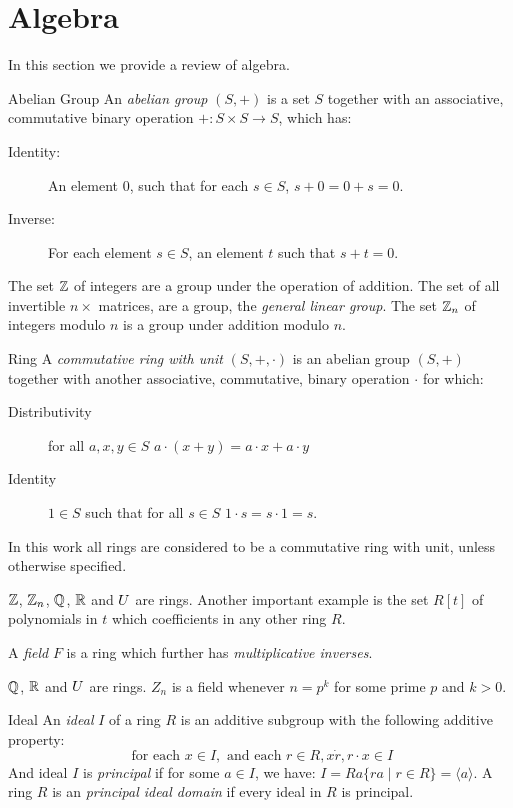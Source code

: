 \section{Algebra}
In this section we provide a review of algebra. 
\begin{definition}{Abelian Group}
An \emph{abelian group} $(S,+)$ is a set $S$ together with an associative, commutative binary operation $+: S \times S \rightarrow S$, which has:
\begin{description}
\item[Identity:] An element $0$, such that for each $s \in S$, $s+0 = 0+s = 0$.
\item[Inverse:] For each element $s \in S$, an element $t$ such that $s+t = 0$.
\end{description}
\end{definition}
\begin{example}
The set $\mathbb{Z}$ of integers are a group under the operation of addition. The set of all invertible $n \times $ matrices, are a group, the \emph{general linear group}.
The set $\mathbb{Z}_n$ of integers modulo $n$ is a group under addition modulo $n$.
\end{example}
\begin{definition}{Ring}
A \emph{commutative ring with unit} $(S,+,\cdot)$ is an abelian group $(S,+)$  together with another associative, commutative, binary operation $\cdot$ for which:
\begin{description}
\item[Distributivity] for all $a,x,y \in S$ $a \cdot (x + y)  = a \cdot x + a \cdot y$ 
\item[Identity]      $1 \in S$ such that for all $s \in S$ $1 \cdot s = s \cdot 1 = s$. 
\end{description}
\end{definition}
In this work all rings are considered to be a commutative ring with unit, unless otherwise specified.  
\begin{example}
$\mathbb{Z}$, $\mathbb{Z}_n$, $\mathbb{Q}$, $\mathbb{R}$ and $U$ are rings. Another important example is the set $R[t]$ of polynomials in $t$ which coefficients in any other ring $R$.
\end{example}
A \emph{field} $F$ is a ring which further has \emph{multiplicative inverses}.
\begin{example}
$\mathbb{Q}$, $\mathbb{R}$ and $U$ are rings.  $Z_n$ is a field whenever $n = p^k$ for some prime $p$ and $k > 0$.
\end{example}
\begin{definition}{Ideal}
An \emph{ideal} $I$ of a ring $R$ is an additive subgroup with the following additive property:
\[ \textrm{ for each } x \in I, \textrm{ and each } r \in R, x \dot r, r \cdot x \in I  \]
And ideal $I$ is \emph{principal} if for some $a \in I$, we have: $I = Ra \{ ra \mid r \in R\} = \langle a \rangle$.
A ring $R$ is an \emph{principal ideal domain} if every ideal in $R$ is principal.
\end{definition}
